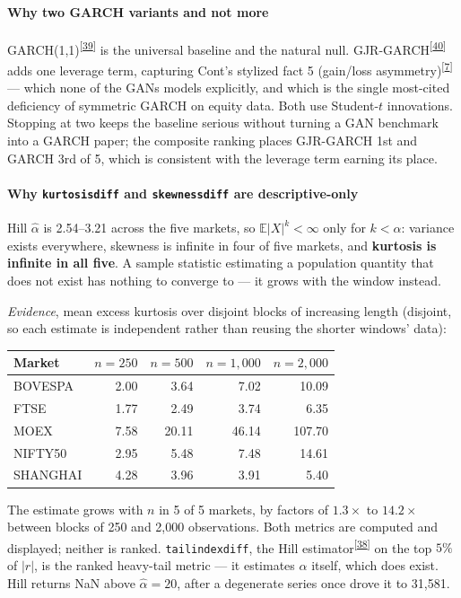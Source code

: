 \documentclass[11pt,a4paper]{article}
\makeatletter
\newcommand{\tcite}[1]{\textsuperscript{[\hyperlink{R:#1}{#1}]}}
\DeclareRobustCommand{\_}{\ifmmode\nfss@text{\textunderscore}\else\textunderscore\allowbreak\fi}
\newcommand{\E}{\mathbb{E}}
\makeatother
\begin{document}
\paragraph{Why two GARCH variants and not more} GARCH(1,1)\tcite{39} is the universal baseline and the natural null. GJR-GARCH\tcite{40} adds one leverage term, capturing Cont's stylized fact 5 (gain/loss asymmetry)\tcite{7} --- which none of the GANs models explicitly, and which is the single most-cited deficiency of symmetric GARCH on equity data. Both use Student-$t$ innovations. Stopping at two keeps the baseline serious without turning a GAN benchmark into a GARCH paper; the composite ranking places GJR-GARCH 1st and GARCH 3rd of 5, which is consistent with the leverage term earning its place.

\paragraph{Why \texttt{kurtosis\_diff} and \texttt{skewness\_diff} are descriptive-only} Hill $\hat\alpha$ is 2.54--3.21 across the five markets, so $\E|X|^k<\infty$ only for $k<\alpha$: variance exists everywhere, skewness is infinite in four of five markets, and \textbf{kurtosis is infinite in all five}. A sample statistic estimating a population quantity that does not exist has nothing to converge to --- it grows with the window instead.

\textit{Evidence}, mean excess kurtosis over disjoint blocks of increasing length (disjoint, so each estimate is independent rather than reusing the shorter windows' data):

\begin{center}\footnotesize
\begin{tabular}{@{}lrrrr@{}}
\toprule
Market & $n=250$ & $n=500$ & $n=1{,}000$ & $n=2{,}000$ \\
\midrule
BOVESPA & 2.00 & 3.64 & 7.02 & 10.09 \\
FTSE & 1.77 & 2.49 & 3.74 & 6.35 \\
MOEX & 7.58 & 20.11 & 46.14 & 107.70 \\
NIFTY50 & 2.95 & 5.48 & 7.48 & 14.61 \\
SHANGHAI & 4.28 & 3.96 & 3.91 & 5.40 \\
\bottomrule
\end{tabular}
\end{center}
The estimate grows with $n$ in 5 of 5 markets, by factors of \(1.3\times\) to \(14.2\times\) between blocks of 250 and 2,000 observations. Both metrics are computed and displayed; neither is ranked. \texttt{tail\_index\_diff}, the Hill estimator\tcite{38} on the top $5\%$ of $|r|$, is the ranked heavy-tail metric --- it estimates $\alpha$ itself, which does exist. Hill returns NaN above $\hat\alpha=20$, after a degenerate series once drove it to 31{,}581.
\end{document}
